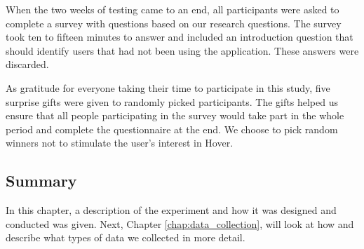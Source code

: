 When the two weeks of testing came to an end, all participants were asked to complete a survey with questions based on our research questions. The survey took ten to fifteen minutes to answer and included an introduction question that should identify users that had not been using the application. These answers were discarded.

As gratitude for everyone taking their time to participate in this study, five surprise gifts were given to randomly picked participants. The gifts helped us ensure that all people participating in the survey would take part in the whole period and complete the questionnaire at the end. We choose to pick random winners not to stimulate the user’s interest in Hover.

\subsection{Summary}
In this chapter, a description of the experiment and how it was designed and conducted was given. Next, Chapter \ref{chap:data_collection}, will look at how and describe what types of data we collected in more detail.
